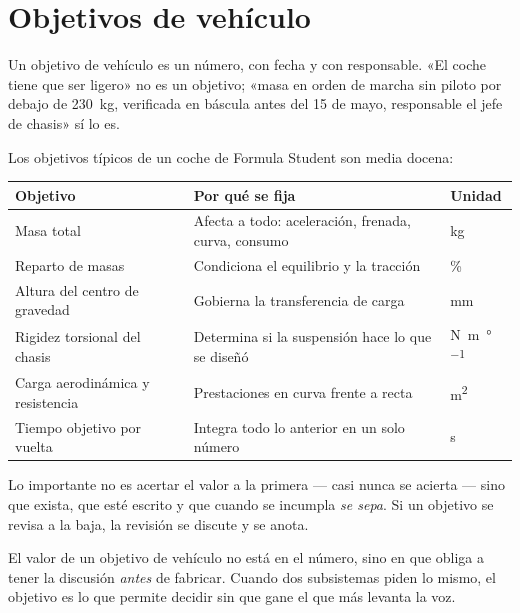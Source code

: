 \section{Objetivos de vehículo}
\label{sec:coche_como_sistema:01}

Un objetivo de vehículo es un número, con fecha y con responsable. «El coche tiene
que ser ligero» no es un objetivo; «masa en orden de marcha sin piloto por debajo
de \SI{230}{\kilogram}, verificada en báscula antes del 15 de mayo, responsable
el jefe de chasis» sí lo es.

Los objetivos típicos de un coche de Formula Student son media docena:

\begin{center}
\begin{tabularx}{\textwidth}{@{}lXl@{}}
\toprule
\textbf{Objetivo} & \textbf{Por qué se fija} & \textbf{Unidad} \\
\midrule
Masa total & Afecta a todo: aceleración, frenada, curva, consumo & \si{\kilogram} \\
Reparto de masas & Condiciona el equilibrio y la tracción & \si{\percent} \\
Altura del centro de gravedad & Gobierna la transferencia de carga & \si{\milli\meter} \\
Rigidez torsional del chasis & Determina si la suspensión hace lo que se diseñó & \si{\newton\meter\per\degree} \\
Carga aerodinámica y resistencia & Prestaciones en curva frente a recta & \si{\meter\squared} \\
Tiempo objetivo por vuelta & Integra todo lo anterior en un solo número & \si{\second} \\
\bottomrule
\end{tabularx}
\end{center}

Lo importante no es acertar el valor a la primera --- casi nunca se acierta ---
sino que exista, que esté escrito y que cuando se incumpla \emph{se sepa}. Si un
objetivo se revisa a la baja, la revisión se discute y se anota.

\begin{clave}
El valor de un objetivo de vehículo no está en el número, sino en que obliga a
tener la discusión \emph{antes} de fabricar. Cuando dos subsistemas piden lo
mismo, el objetivo es lo que permite decidir sin que gane el que más levanta la voz.
\end{clave}

